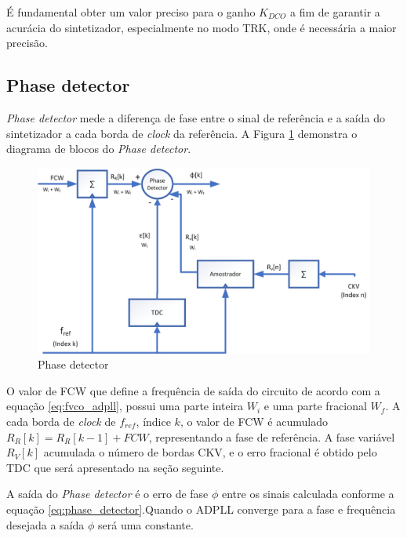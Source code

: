 É fundamental obter um valor preciso para o ganho $K_{DCO}$ a fim de garantir a acurácia do sintetizador, especialmente no modo TRK, onde é necessária a maior precisão.

\subsection{Phase detector}
\textit{Phase detector } mede a diferença de fase entre o sinal de referência e a saída do sintetizador a cada borda de \textit{clock} da referência. A Figura \ref{fig:phase_detector_block} demonstra o diagrama de blocos do \textit{Phase detector}.

\begin{figure}[h!]
	\caption{Phase detector}
	\begin{center}
		\includegraphics[scale=0.8]{img/phase_detector_block.png}
	\end{center}
	\label{fig:phase_detector_block}
\end{figure}

O valor de FCW que define a frequência de saída do circuito de acordo com a equação \ref{eq:fvco_adpll}, possui uma parte inteira $W_i$ e uma parte fracional $W_f$. 
 A cada borda de \textit{clock} de $f_{ref}$, índice $k$, o valor de FCW é acumulado $R_R[k] = R_R[k-1] + FCW$, representando a fase de referência. A fase variável $R_V[k]$ acumulada o número de bordas CKV, e o erro fracional é obtido pelo TDC que será apresentado na seção seguinte.

A saída do \textit{Phase detector } é o erro de fase $\phi$ entre os sinais calculada conforme a equação \ref{eq:phase_detector}.Quando o ADPLL converge para a fase e frequência desejada a saída $\phi$ será uma constante.

